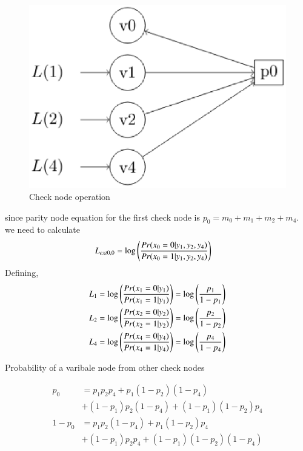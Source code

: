 \documentclass[journal,12pt,twocolumn]{IEEEtran}
\begin{document}
\begin{enumerate}
\begin{figure}[!ht]
\begin{center}
\includegraphics[width=\columnwidth]{./figs/checkope}
\end{center}
\caption{Check node operation}
\label{fig : check}
\end{figure}
since parity node equation for the first check node is $p_0=m_0+m_1+m_2+m_4$. we need to calculate
\begin{align}
L_{ext0,0} &= \log \left(\frac{Pr(x_0 =0 | y_1,y_2,y_4)}{Pr(x_0 =1| y_1,y_2,y_4)}\right)
\end{align}
Defining,
\begin{align}
L_1 &= \log \left(\frac{Pr(x_1 =0 | y_1)}{Pr(x_1 =1| y_1)}\right) = \log \left(\frac{p_1}{1-p_1}\right) \\
L_2 &= \log \left(\frac{Pr(x_2 =0 | y_2)}{Pr(x_2 =1| y_2)}\right)=\log \left(\frac{p_2}{1-p_2}\right) \\
L_4 &= \log \left(\frac{Pr(x_4 =0 | y_4)}{Pr(x_4 =1| y_4)}\right)= \log \left(\frac{p_4}{1-p_4}\right) \\
\end{align}
\begin{table}[!ht]
\begin{center}
{\tiny

}
\end{center}
\caption{Probability of a varibale node from other check nodes}
\label{table:type}
\end{table}
\begin{align*}
p_0 &= p_1p_2p_4 + p_1(1-p_2)(1-p_4)\\
&+(1-p_1)p_2(1-p_4)
+(1-p_1)(1-p_2)p_4\\
1-p_0 &=p_1p_2(1-p_4) + p_1(1-p_2)p_4\\
&+(1-p_1)p_2p_4+(1-p_1)(1-p_2)(1-p_4)\\

\end{align*}
\end{enumerate}
\end{document}
